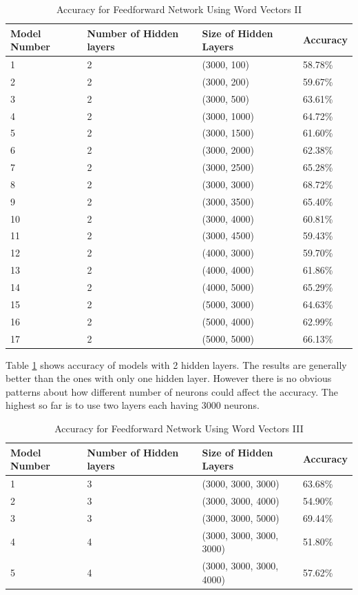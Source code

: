 \documentclass[11pt]{article}
\theoremstyle{plain}
\begin{document}
\begin{table}[!ht]
	\centering
	\caption{Accuracy for Feedforward Network Using Word 
		Vectors II}\label{t:results-nn2}
	\begin{tabular}{llll}
		\hline \hline 
		Model Number & Number of Hidden layers & Size of Hidden Layers 
		&Accuracy\\
		\hline
		1 & 2 & (3000, 100) &   58.78\%   \\
		2 & 2 & (3000, 200) &   59.67\%   \\
		3 & 2 & (3000, 500) &   63.61\%   \\
		4 & 2 & (3000, 1000) &   64.72\%   \\
		5 & 2 & (3000, 1500) &   61.60\%   \\
		6 & 2 & (3000, 2000) &   62.38\%   \\
		7 & 2 & (3000, 2500) &   65.28\%   \\
		8 & 2 & (3000, 3000) &   68.72\%   \\
		9 & 2 & (3000, 3500) &   65.40\%   \\
		10 & 2 & (3000, 4000) &   60.81\%   \\
		11 & 2 & (3000, 4500) &   59.43\%   \\
		12 & 2 & (4000, 3000) &   59.70\%   \\
		13 & 2 & (4000, 4000) &   61.86\%   \\
		14 & 2 & (4000, 5000) &   65.29\%   \\
		15 & 2 & (5000, 3000) &   64.63\%   \\
		16 & 2 & (5000, 4000) &   62.99\%   \\
		17 & 2 & (5000, 5000) &   66.13\%   \\
		\hline \hline 
	\end{tabular}
\end{table}

Table \ref{t:results-nn2} shows accuracy of models with 2 hidden layers. The 
results are generally better than the ones with only one hidden layer. 
However there is no obvious patterns about how different number of 
neurons could affect the accuracy. The highest so far is to use two layers 
each having 3000 neurons. 

\begin{table}[!ht]
	\centering
	\caption{Accuracy for Feedforward Network Using Word 
		Vectors III}\label{t:results-nn3}
	\begin{tabular}{llll}
		\hline \hline 
		Model Number & Number of Hidden layers & Size of Hidden Layers 
		&Accuracy\\
		\hline
		1 & 3 & (3000, 3000, 3000) &   63.68\%   \\
		2 & 3 & (3000, 3000, 4000) &   54.90\%   \\
		3 & 3 & (3000, 3000, 5000)&   69.44\%   \\
		4 & 4 & (3000, 3000, 3000, 3000) &   51.80\%   \\
		5 & 4 & (3000, 3000, 3000, 4000) &   57.62\%   \\
		\hline \hline 
	\end{tabular}
\end{table}
\end{document}

